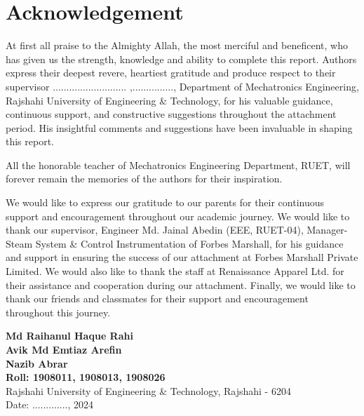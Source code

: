 \section*{Acknowledgement}
 
At first all praise to the Almighty Allah, the most merciful and beneficent, who has given us the strength, knowledge and ability to complete this report. 
Authors express their deepest revere, heartiest gratitude and produce respect to their supervisor ........................... ,..............., Department of Mechatronics Engineering, Rajshahi University of Engineering \& Technology, for his valuable guidance, continuous support, and constructive suggestions throughout the attachment period. His insightful comments and suggestions have been invaluable in shaping this report.

All the honorable teacher of Mechatronics Engineering Department, RUET, will forever remain the memories of the authors for their inspiration. 

We would like to express our gratitude to our parents for their continuous support and encouragement throughout our academic journey. We would like to thank our supervisor, Engineer Md. Jainal Abedin (EEE, RUET-04), Manager-Steam System \& Control Instrumentation of Forbes Marshall, for his guidance and support in ensuring the success of our attachment at Forbes Marshall Private Limited. We would also like to thank the staff at Renaissance Apparel Ltd. for their assistance and cooperation during our attachment. Finally, we would like to thank our friends and classmates for their support and encouragement throughout this journey.

\begin{flushright}
    \textbf{Md Raihanul Haque Rahi}\\
    \textbf{Avik Md Emtiaz Arefin}\\
    \textbf{Nazib Abrar}\\
    \textbf{Roll: 1908011, 1908013, 1908026}\\
    Rajshahi University of Engineering \& Technology, Rajshahi - 6204\\
    Date: ............., 2024  
\end{flushright}

 
 
 
 
 
